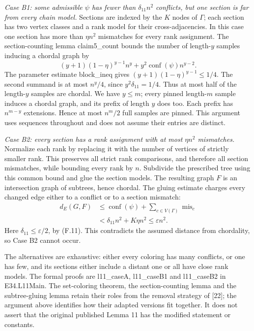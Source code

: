 \documentclass[english,11pt,a4paper]{article}
\begin{document}
\emph{Case B1: some admissible \(\psi\) has fewer than \(\delta_{11}n^2\) conflicts, but one section is far from every chain model.} Sections are indexed by the \(K\) nodes of \(\Gamma\); each section has two vertex classes and a rank model for their cross-adjacencies. In this case one section has more than \(\eta n^2\) mismatches for every rank assignment. The section-counting lemma {\ttfamily\small claim5\_\discretionary{\hbox{\ensuremath{\hookrightarrow}}}{}{}count} bounds the number of length-\(y\) samples inducing a chordal graph by \[
(y+1)(1-\eta)^{y-1}n^y+
y^2\operatorname{conf}(\psi)n^{y-2}.
\] The parameter estimate {\ttfamily\small block\_\discretionary{\hbox{\ensuremath{\hookrightarrow}}}{}{}ineq} gives \((y+1)(1-\eta)^{y-1}\le1/4\). The second summand is at most \(n^y/4\), since \(y^2\delta_{11}=1/4\). Thus at most half of the length-\(y\) samples are chordal. We have \(y\le m\); every pinned length-\(m\) sample induces a chordal graph, and its prefix of length \(y\) does too. Each prefix has \(n^{m-y}\) extensions. Hence at most \(n^m/2\) full samples are pinned. This argument uses sequences throughout and does not assume their entries are distinct.

\emph{Case B2: every section has a rank assignment with at most \(\eta n^2\) mismatches.} Normalize each rank by replacing it with the number of vertices of strictly smaller rank. This preserves all strict rank comparisons, and therefore all section mismatches, while bounding every rank by \(n\). Subdivide the prescribed tree using this common bound and glue the section models. The resulting graph \(F\) is an intersection graph of subtrees, hence chordal. The gluing estimate charges every changed edge either to a conflict or to a section mismatch: \[
\begin{aligned}
d_E(G,F)&\le\operatorname{conf}(\psi)+
             \sum_{c\in V(\Gamma)}\operatorname{mis}_c\\
&<\delta_{11}n^2+K\eta n^2
\le\varepsilon n^2.
\end{aligned}
\tag{F.12}
\] Here \(\delta_{11}\le\varepsilon/2\), by (F.11). This contradicts the assumed distance from chordality, so Case B2 cannot occur.

The alternatives are exhaustive: either every coloring has many conflicts, or one has few, and its sections either include a distant one or all have close rank models. The formal proofs are {\ttfamily\small l11\_\discretionary{\hbox{\ensuremath{\hookrightarrow}}}{}{}caseA}, {\ttfamily\small l11\_\discretionary{\hbox{\ensuremath{\hookrightarrow}}}{}{}caseB1} and {\ttfamily\small l11\_\discretionary{\hbox{\ensuremath{\hookrightarrow}}}{}{}caseB2} in E34.L11Main. The set-coloring theorem, the section-counting lemma and the subtree-gluing lemma retain their roles from the removal strategy of {[}22{]}; the argument above identifies how their adapted versions fit together. It does not assert that the original published Lemma 11 has the modified statement or constants.
\end{document}

